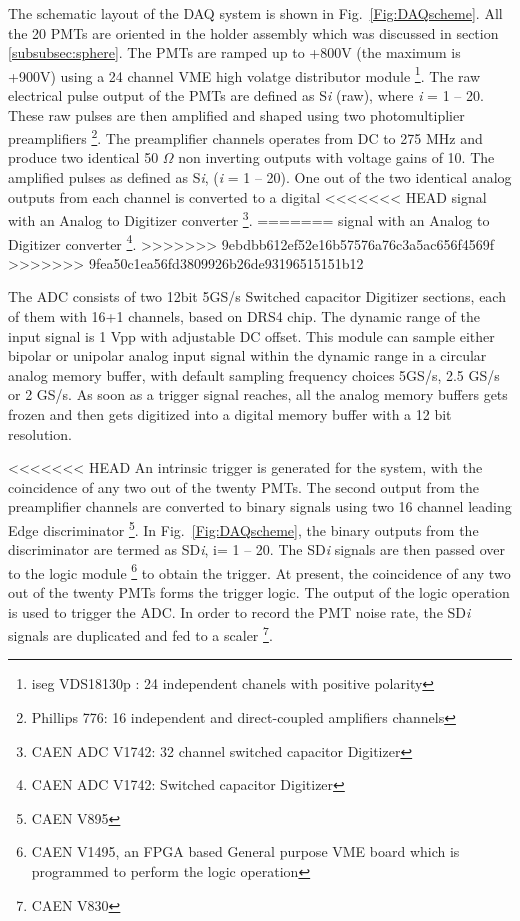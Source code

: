 The schematic layout 
of the DAQ system is shown in Fig.~{\ref{Fig:DAQscheme}}. All the 20 PMTs 
are oriented in the holder assembly which was discussed in section \ref{subsubsec:sphere}. 
The PMTs are ramped up to +800V (the maximum is +900V) using a 24 channel 
VME high volatge distributor module \footnote{iseg VDS18130p : 24 independent chanels with positive polarity}.  
The raw electrical pulse output of the PMTs are defined as S{\it i} (raw), where {\it i} = 1 -- 20. 
These raw pulses are then 
amplified and shaped using two photomultiplier preamplifiers \footnote{Phillips 776: 16 independent  and direct-coupled 
amplifiers channels}. The preamplifier channels operates from DC to 275 MHz and 
produce two identical 50 $\Omega$ non inverting outputs with voltage gains of 10. 
The amplified pulses as defined as S{\it i}, ({\it i} = 1 -- 20). One out of the 
two identical analog outputs from each channel is converted to a digital 
<<<<<<< HEAD
signal with an Analog to Digitizer converter \footnote{CAEN ADC V1742: 32 channel switched capacitor Digitizer}. 
=======
signal with an Analog to Digitizer converter \footnote{CAEN ADC V1742: Switched capacitor Digitizer}. 
>>>>>>> 9ebdbb612ef52e16b57576a76c3a5ac656f4569f
>>>>>>> 9fea50c1ea56fd3809926b26de93196515151b12

The ADC consists of two 12bit 5GS/s Switched capacitor Digitizer sections, 
each of them with 16+1 channels, based on DRS4 chip. The dynamic range of the input signal is 1 Vpp with adjustable DC offset. This module can sample either bipolar or unipolar analog input signal within the dynamic range in a circular 
analog memory buffer, with default sampling frequency choices 5GS/s, 2.5 GS/s 
or 2 GS/s. As soon as a trigger signal reaches, all the analog memory 
buffers gets frozen and then gets digitized into a digital memory buffer 
with a 12 bit resolution. 

<<<<<<< HEAD
An intrinsic trigger is generated for the system, 
with the coincidence of any two out of the twenty PMTs. The second output from the 
preamplifier channels are converted to binary signals using two 16 channel leading 
Edge discriminator \footnote{CAEN V895}. In Fig.~\ref{Fig:DAQscheme}, the binary 
outputs from the discriminator are termed as SD{\it i}, i= 1 -- 20. The SD{\it i} signals are then passed over to 
the logic module \footnote{CAEN V1495, an FPGA based General purpose VME board which is programmed to perform the 
logic operation} to obtain the trigger. At present, the coincidence of any two out 
of the twenty PMTs forms the trigger logic. The output of the logic operation is 
used to trigger the ADC. In order to record the PMT noise rate, the 
SD{\it i} signals are duplicated and fed to a scaler \footnote{CAEN V830}.

